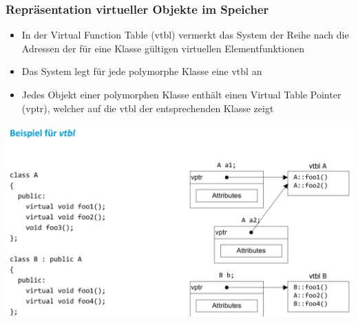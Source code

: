 \subsubsection{Repräsentation virtueller Objekte im Speicher}
\begin{minipage}{0.45\linewidth}
	\begin{itemize}
		\item In der Virtual Function Table (vtbl) vermerkt das System der Reihe nach die Adressen der für eine Klasse gültigen virtuellen Elementfunktionen
		\item Das System legt für jede polymorphe Klasse eine vtbl an
		\item Jedes Objekt einer polymorphen Klasse enthält einen Virtual Table Pointer (vptr), welcher auf die vtbl der entsprechenden Klasse zeigt
	\end{itemize}
\end{minipage}
\begin{minipage}{0.5\linewidth}
	\includegraphics[width=\linewidth]{images/vtbl.png}
\end{minipage}

